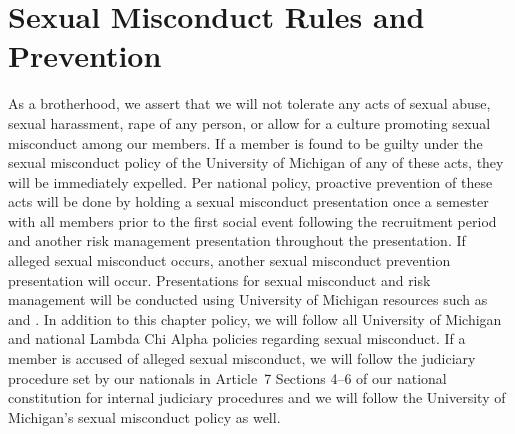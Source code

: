 \documentclass{article}
\begin{document}
\section{Sexual Misconduct Rules and Prevention}

As a brotherhood, we assert that we will not tolerate any acts of sexual abuse,
sexual harassment, rape of any person, or allow for a culture promoting sexual
misconduct among our members. If a member is found to be guilty under the sexual
misconduct policy of the University of Michigan of any of these acts, they will
be immediately expelled. Per national policy, proactive prevention of these acts
will be done by holding a sexual misconduct presentation once a semester with
all members prior to the first social event following the recruitment period and
another risk management presentation throughout the presentation. If alleged
sexual misconduct occurs, another sexual misconduct prevention presentation will
occur. Presentations for sexual misconduct and risk management will be conducted
using University of Michigan resources such as  and
. In addition to this chapter policy, we will follow all
University of Michigan and national Lambda Chi Alpha policies regarding sexual
misconduct. If a member is accused of alleged sexual misconduct, we will follow
the judiciary procedure set by our nationals in Article~7 Sections 4–6 of our
national constitution for internal judiciary procedures and we will follow the
University of Michigan’s sexual misconduct policy as well.
\end{document}
